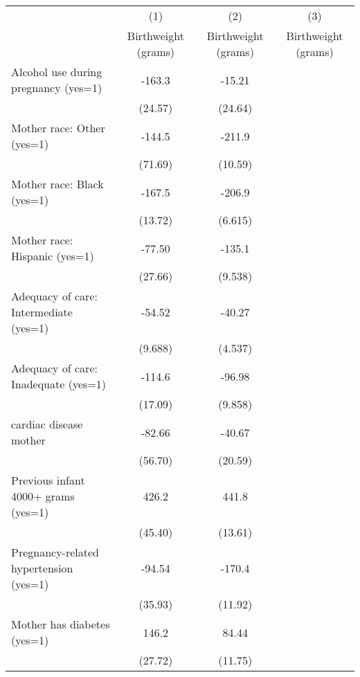 
\begin{tabular}{l*{3}{c}}
\hline\hline
                    &\multicolumn{1}{c}{(1)}&\multicolumn{1}{c}{(2)}&\multicolumn{1}{c}{(3)}\\
                    &\multicolumn{1}{c}{Birthweight (grams)}&\multicolumn{1}{c}{Birthweight (grams)}&\multicolumn{1}{c}{Birthweight (grams)}\\
\hline
Alcohol use during pregnancy (yes=1)&      -163.3&      -15.21&            \\
                    &     (24.57)&     (24.64)&            \\
[1em]
Mother race: Other (yes=1)&      -144.5&      -211.9&            \\
                    &     (71.69)&     (10.59)&            \\
[1em]
Mother race: Black (yes=1)&      -167.5&      -206.9&            \\
                    &     (13.72)&     (6.615)&            \\
[1em]
Mother race: Hispanic (yes=1)&      -77.50&      -135.1&            \\
                    &     (27.66)&     (9.538)&            \\
[1em]
Adequacy of care: Intermediate (yes=1)&      -54.52&      -40.27&            \\
                    &     (9.688)&     (4.537)&            \\
[1em]
Adequacy of care: Inadequate (yes=1)&      -114.6&      -96.98&            \\
                    &     (17.09)&     (9.858)&            \\
[1em]
cardiac disease mother&      -82.66&      -40.67&            \\
                    &     (56.70)&     (20.59)&            \\
[1em]
Previous infant 4000+ grams (yes=1)&       426.2&       441.8&            \\
                    &     (45.40)&     (13.61)&            \\
[1em]
Pregnancy-related hypertension (yes=1)&      -94.54&      -170.4&            \\
                    &     (35.93)&     (11.92)&            \\
[1em]
Mother has diabetes (yes=1)&       146.2&       84.44&            \\
                    &     (27.72)&     (11.75)&            \\

\end{tabular}
